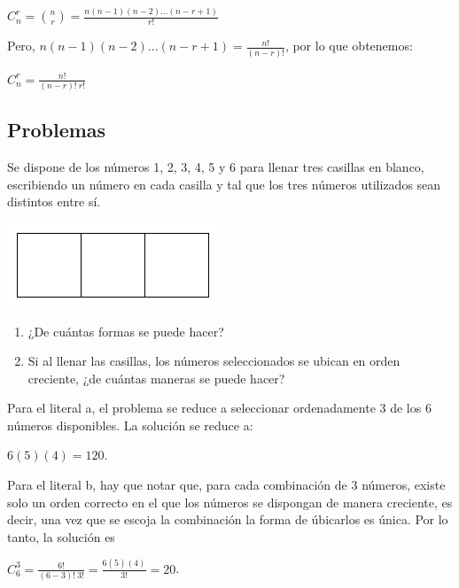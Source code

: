 \documentclass[12pt]{article}
\begin{document}
\begin{center}
    $ C^{r}_{n}= \binom{n}{r} = \frac{n (n-1)(n-2)...(n-r+1)}{r!}$
\end{center}

Pero,  $n (n-1)(n-2)...(n-r+1)=\frac{n!}{(n-r)!}$, por lo que obtenemos:

\begin{center}
    $ C^{r}_{n}= \frac{n!}{(n-r)! \ r!}$
\end{center}

\subsection{Problemas}

\begin{problema}
    Se dispone de los números 1, 2, 3, 4, 5 y 6 para llenar tres casillas en blanco, escribiendo un número en cada casilla y tal que los tres números utilizados sean distintos entre sí.
    
    \begin{center}
        \includegraphics[scale=0.4]{Imagenes/IMG1/ejem.png}
    \end{center}
    
    \renewcommand{\labelenumi}{\alph{enumi})}
    \begin{enumerate}
        \item ¿De cuántas formas se puede hacer?
        \item Si al llenar las casillas, los números seleccionados se ubican en orden creciente, ¿de cuántas maneras se puede hacer?
    \end{enumerate}
\end{problema}

\begin{solucion}
    Para el literal a, el problema se reduce a seleccionar ordenadamente 3 de los 6 números disponibles. La solución se reduce a:

    \begin{center}
        $6 (5) (4)= 120$.
    \end{center}

    Para el literal b, hay que notar que, para cada combinación de 3 números, existe solo un orden correcto en el que los números se dispongan de manera creciente, es decir, una vez que se escoja la combinación la forma de úbicarlos es única. Por lo tanto, la solución es 
    
    \begin{center}
        $C^{3}_{6}=\frac{6!}{(6-3)! \ 3!}= \frac{6 (5) (4)}{3!}=20$.
    \end{center}
\end{solucion}
\end{document}
